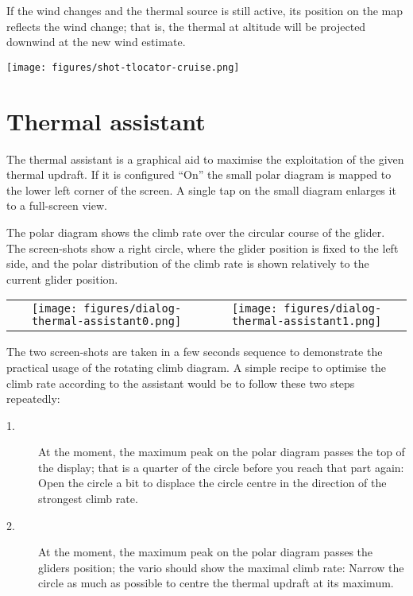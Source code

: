 If the wind changes and the thermal source is still active, its 
position on the map reflects the wind change; that is, the thermal 
at altitude will be projected downwind at the new wind estimate.

\begin{center}
\texttt{[image: figures/shot-tlocator-cruise.png]}
\end{center}


\section{Thermal assistant}\label{sec:thermal-assistant}

The thermal assistant is a graphical aid to maximise the exploitation of the
given thermal updraft. If it is configured ``On''  the
small polar diagram is mapped to the lower left corner of the screen. A
single tap on the small diagram enlarges it to a full-screen view. 

The polar diagram shows the climb rate over the circular course of the glider.
The screen-shots show a right circle, where the glider position is fixed to the
left side, and the polar distribution of the climb rate is shown relatively to
the current glider position.


\begin{tabular}{c c}
\texttt{[image: figures/dialog-thermal-assistant0.png]}&
\texttt{[image: figures/dialog-thermal-assistant1.png]}\\
\end{tabular}

The two screen-shots are taken in a few seconds sequence to demonstrate the
practical usage of the rotating climb diagram. A simple recipe to optimise
the climb rate according to the assistant would be to follow these two steps
repeatedly:
\begin{description}
\item[1.]  At the moment, the maximum peak on the polar diagram passes the top of
the display; that is a quarter of the circle before you reach that part again:
Open the circle a bit to displace the circle centre in the direction of the
strongest climb rate.
\item[2.]  At the moment, the maximum peak on the polar diagram passes the
gliders position; the vario should show the maximal climb rate: Narrow the
circle as much as possible to centre the thermal updraft at its maximum. 
\end{description}


